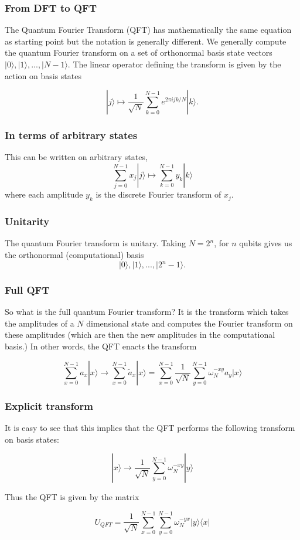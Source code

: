 \documentclass{beamer}
\begin{document}
\begin{frame}
\frametitle{From DFT to QFT}

The Quantum Fourier Transform (QFT) has mathematically the same equation as starting point
but the notation is generally different. We generally compute the
quantum Fourier transform on a set of orthonormal basis state vectors
\(|0\rangle, |1\rangle, ..., |N-1\rangle\). The linear operator defining
the transform is given by the action on basis states

\[
|j\rangle \mapsto \frac{1}{\sqrt{N}} \sum_{k=0}^{N-1} e^{2\pi ijk/N}|k\rangle.
\]
\end{frame}

\begin{frame}
\frametitle{In terms of arbitrary states}

This can be written on arbitrary states,
\[
\sum_{j=0}^{N-1}x_j|j\rangle \mapsto \sum_{k=0}^{N-1} y_k|k\rangle
\]
where each amplitude \(y_k\) is the discrete Fourier transform of
\(x_j\).
\end{frame}

\begin{frame}
\frametitle{Unitarity}

The quantum Fourier transform is unitary. Taking \(N = 2^n\),
for \(n\) qubits gives us the orthonormal (computational) basis
\[
|0\rangle, |1\rangle, ..., |2^{n}-1\rangle.
\]
\end{frame}

\begin{frame}
\frametitle{Full QFT}

So what is the full quantum Fourier transform? It is the transform
which takes the amplitudes of a $N$ dimensional state and computes the
Fourier transform on these amplitudes (which are then the new
amplitudes in the computational basis.) In other words, the QFT enacts
the transform

\begin{equation*}
\sum_{x=0}^{N-1} a_{x}|x\rangle \rightarrow \sum_{x=0}^{N-1} \tilde{a}_{x}|x\rangle=\sum_{x=0}^{N-1} \frac{1}{\sqrt{N}} \sum_{y=0}^{N-1} \omega_{N}^{-x y} a_{y}|x\rangle 
\end{equation*}
\end{frame}

\begin{frame}
\frametitle{Explicit transform}

It is easy to see that this implies that the QFT performs the following transform on basis states:

\begin{equation*}
|x\rangle \rightarrow \frac{1}{\sqrt{N}} \sum_{y=0}^{N-1} \omega_{N}^{-x y}|y\rangle
\end{equation*}

Thus the QFT is given by the matrix

\begin{equation*}
U_{Q F T}=\frac{1}{\sqrt{N}} \sum_{x=0}^{N-1} \sum_{y=0}^{N-1} \omega_{N}^{-y x}|y\rangle\langle x| 
\end{equation*}
\end{frame}
\end{document}

